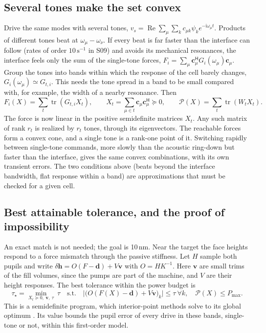 \documentclass[11pt,a4paper]{article}
\numberwithin{equation}{section}
\DeclareMathOperator{\tr}{tr}
\DeclareMathOperator{\Rea}{Re}
\begin{document}
\subsection{Several tones make the set convex}\label{sec:multitone}
Drive the same modes with several tones,
$v_s=\Rea\sum_\mu\sum_kc_{\mu k}\psi_ke^{-\mathrm i\omega_\mu t}$. Products of
different tones beat at $\omega_\mu-\omega_\nu$. If every beat is far faster
than the interface can follow (rates of order $10\,\mathrm s^{-1}$ in S09) and
avoids its mechanical resonances, the interface feels only the sum of the
single-tone forces, $F_i=\sum_\mu\bm c_\mu^{\mathsf H}G_i(\omega_\mu)\bm c_\mu$.
Group the tones into bands within which the response of the cell barely
changes, $G_i(\omega_\mu)\simeq G_{t,i}$. This needs the tone spread in a band
to be small compared with, for example, the width of a nearby resonance. Then
\begin{equation}
 F_i(X)=\sum_t\tr(G_{t,i}X_t),\qquad
 X_t=\sum_{\mu\in t}\bm c_\mu\bm c_\mu^{\mathsf H}\succeq0,\qquad
 \mathcal P(X)=\sum_t\tr(W_tX_t).
 \label{eq:multitone}
\end{equation}
The force is now linear in the positive semidefinite matrices $X_t$. Any such
matrix of rank $r_t$ is realized by $r_t$ tones, through its eigenvectors. The
reachable forces form a convex cone, and a single tone is a rank-one point of
it. Switching rapidly between single-tone commands, more slowly than the
acoustic ring-down but faster than the interface, gives the same convex
combinations, with its own transient errors. The two conditions above (beats
beyond the interface bandwidth, flat response within a band) are approximations
that must be checked for a given cell.

\subsection{Best attainable tolerance, and the proof of impossibility}
An exact match is not needed; the goal is 10\,nm. Near the target the face
heights respond to a force mismatch through the passive stiffness. Let $H$
sample both pupils and write $\delta\bm h=O(F-\bm d)+V\bm v$ with $O=HK^{-1}$.
Here $\bm v$ are small trims of the fill volumes, since the pumps are part of
the machine, and $V$ are their height responses. The best tolerance within the
power budget is
\begin{equation}
 \tau_\star=\min_{X_t\succeq0,\ \bm v,\ \tau}\ \tau
 \quad\text{s.t.}\quad
 \bigl|\bigl(O(F(X)-\bm d)+V\bm v\bigr)_k\bigr|\le\tau\ \forall k,\quad
 \mathcal P(X)\le P_{\max}.
 \label{eq:sdp}
\end{equation}
This is a semidefinite program, which interior-point methods solve to its
global optimum \cite{vandenberghe1996}. Its value bounds the pupil error of
every drive in these bands, single-tone or not, within this first-order model.
\end{document}
